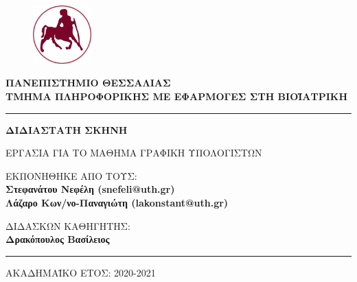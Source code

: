 

\newcommand{\thesisAuthora}{Στεφανάτου Νεφέλη (snefeli@uth.gr)}
\newcommand{\thesisAuthorb}{Λάζαρο Κων/νο-Παναγιώτη (lakonstant@uth.gr)}

\newcommand{\thesisTitle}{ΔΙΔΙΑΣΤΑΤΗ ΣΚΗΝΗ }
\newcommand{\thesisSubTitle}{ΕΡΓΑΣΙΑ ΓΙΑ ΤΟ ΜΑΘΗΜΑ ΓΡΑΦΙΚΗ ΥΠΟΛΟΓΙΣΤΩΝ }
\newcommand{\professor}{Δρακόπουλος Βασίλειος}
\newcommand{\academicYear}{2020-2021}

\begin{titlepage}
\thispagestyle{empty}


\begin{figure}
\centering
\vspace{-2cm}
    \hspace*{0cm}\includegraphics[width = 0.2\textwidth]{uth_logo.png}\hspace*{0cm}
\end{figure}


\centering 
\textcolor{uthred} {\large \textbf{ΠΑΝΕΠΙΣΤΗΜΙΟ ΘΕΣΣΑΛΙΑΣ}}\\
\vspace{0.2cm}
\textcolor{uthred}{\textbf{ΤΜΗΜΑ ΠΛΗΡΟΦΟΡΙΚΗΣ ΜΕ ΕΦΑΡΜΟΓΕΣ ΣΤΗ ΒΙΟΪΑΤΡΙΚΗ}}\\

\rule[-0.2cm]{\linewidth}{0.5pt}

\vspace{3cm}
\par
\noindent
\Huge
\centering
\textbf{\thesisTitle}\\
\vspace{0.2cm}
\small
\par
\noindent
\thesisSubTitle\\
\Large


\vspace{2cm}
\noindent
\Large
ΕΚΠΟΝΗΘΗΚΕ ΑΠΟ ΤΟΥΣ:\\
\textbf{\thesisAuthora}\\
\textbf{\thesisAuthorb}\\
\vspace{3 cm}

\par \noindent
\Large
ΔΙΔΑΣΚΩΝ ΚΑΘΗΓΗΤΗΣ:\\ \textbf{\professor}\\
\vspace{2.5cm}

\rule[0.2cm]{\linewidth}{0.5pt}

ΑΚΑΔΗΜΑΪΚΟ ΕΤΟΣ: \academicYear

\end{titlepage}
